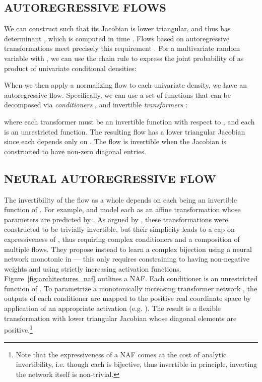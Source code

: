 \documentclass[letterpaper]{article}
\begin{document}
\subsection{AUTOREGRESSIVE FLOWS} \label{sec:auto} 
We can construct  such that its Jacobian is lower triangular, and thus has determinant , which is computed in time . Flows based on autoregressive transformations meet precisely this requirement \citep{kingma2016improved, pmlr-v80-oliva18a, huang2018neural}. For a multivariate random variable  with , we can use the chain rule to express the joint probability of  as product of  univariate conditional densities:

When we then apply a normalizing flow to each univariate density, we have an autoregressive flow. 
Specifically, we can use a set of functions  that can be decomposed via \emph{conditioners} , and invertible \emph{transformers} :

where each transformer  must be an invertible function with respect to , and each  is an unrestricted function. The resulting flow has a lower triangular Jacobian since each  depends only on . The flow is invertible when the Jacobian is constructed to have non-zero diagonal entries.

\subsection{NEURAL AUTOREGRESSIVE FLOW} \label{sec:naf}
The invertibility of the flow as a whole depends on each  being an invertible function of . 
For example, \citet{dinh2014nice} and \citet{kingma2016improved} model each  as an affine transformation whose parameters are predicted by . As argued by \citet{huang2018neural}, these transformations were constructed to be trivially invertible, but their simplicity leads to a cap on expressiveness of , thus requiring complex conditioners and a composition of multiple flows. They propose instead to learn a complex bijection using a neural network monotonic in  --- this only requires constraining  to having non-negative weights and using strictly increasing activation functions. Figure~\ref{fig:architectures_naf} outlines a NAF. Each conditioner  is an unrestricted function of . To parametrize a monotonically increasing transformer network , the outputs of each conditioner  are mapped to the positive real coordinate space by application of an appropriate activation (e.g. ). The result is a flexible transformation with lower triangular Jacobian whose diagonal elements are positive.\footnote{Note that the expressiveness of a NAF comes at the cost of analytic invertibility, i.e. though each  is bijective, thus invertible in principle, inverting the network itself is non-trivial.}
\end{document}
